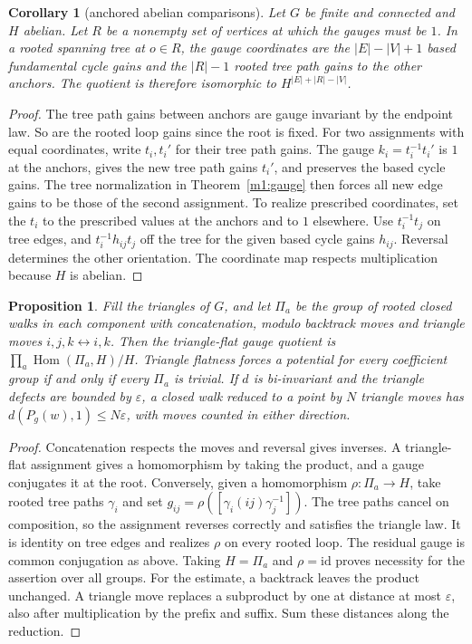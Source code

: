 \documentclass[11pt,reqno]{amsart}
\newtheorem{proposition}[theorem]{Proposition}
\newtheorem{corollary}[theorem]{Corollary}
\theoremstyle{definition}
\theoremstyle{remark}
\numberwithin{equation}{section}
\begin{document}
\begin{corollary}[anchored abelian comparisons]\label{m1:anchored}
Let \(G\) be finite and connected and \(H\) abelian. Let \(R\) be a
nonempty set of vertices at which the gauges must be \(1\).
In a rooted spanning tree at \(o\in R\), the gauge
coordinates are the \(|E|-|V|+1\) based fundamental cycle
gains and the \(|R|-1\) rooted tree path gains to the other
anchors. The quotient is therefore isomorphic to \(H^{|E|+|R|-|V|}\).
\end{corollary}
\begin{proof}
The tree path gains between anchors are gauge invariant by the
endpoint law. So are the rooted loop gains since the root is fixed.
For two assignments with equal coordinates, write \(t_i,t_i'\)
for their tree path gains. The gauge \(k_i=t_i^{-1}t_i'\)
is \(1\) at the anchors, gives the new tree path gains \(t_i'\),
and preserves the based cycle gains. The tree normalization
in Theorem~\ref{m1:gauge} then forces all new edge gains to
be those of the second assignment. To realize prescribed
coordinates, set the \(t_i\) to the prescribed values at the
anchors and to \(1\) elsewhere. Use \(t_i^{-1}t_j\) on tree
edges, and \(t_i^{-1}h_{ij}t_j\) off the tree for the given
based cycle gains \(h_{ij}\). Reversal determines the other
orientation. The coordinate map respects multiplication
because \(H\) is abelian.
\end{proof}

\begin{proposition}\label{m1:clique}
Fill the triangles of \(G\), and let \(\Pi_a\) be the group
of rooted closed walks in each component with concatenation,
modulo backtrack moves and triangle moves \(i,j,k\leftrightarrow
i,k\). Then the triangle-flat gauge quotient is
\(\prod_a\operatorname{Hom}(\Pi_a,H)/H\).
Triangle flatness forces a potential for every coefficient group
if and only if every \(\Pi_a\) is trivial. If \(d\) is bi-invariant
and the triangle defects are bounded by \(\varepsilon\), a
closed walk reduced to a point by \(N\) triangle moves has
\(d(P_g(w),1)\le N\varepsilon\), with moves counted in either
direction.
\end{proposition}
\begin{proof}
Concatenation respects the moves and reversal gives inverses.
A triangle-flat assignment gives a homomorphism by taking the
product, and a gauge conjugates it at the root. Conversely, given
a homomorphism \(\rho:\Pi_a\to H\), take rooted tree paths
\(\gamma_i\) and set
\(g_{ij}=\rho([\gamma_i(ij)\gamma_j^{-1}])\).
The tree paths cancel on composition, so the assignment reverses
correctly and satisfies the triangle law. It is identity on tree
edges and realizes \(\rho\) on every rooted loop. The residual
gauge is common conjugation as above. Taking \(H=\Pi_a\) and
\(\rho=\mathrm{id}\) proves necessity for the assertion over
all groups. For the estimate, a backtrack leaves the product
unchanged. A triangle move replaces a subproduct by one at
distance at most \(\varepsilon\), also after multiplication
by the prefix and suffix. Sum these distances along the reduction.
\end{proof}
\end{document}
